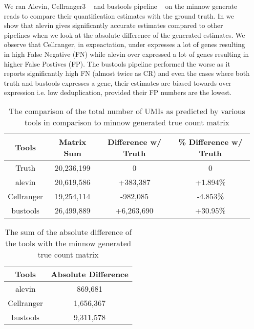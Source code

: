 We ran Alevin, Cellranger3 ~\citep{tenx} and bustools pipeline ~\citep{melsted2019modular} on the minnow 
generate reads to compare their quantification estimates with the ground truth. 
In  we show that alevin gives significantly accurate estimates 
compared to other pipelines when we look at the absolute difference of the generated estimates. We observe 
that Cellranger, in expeactation, under expresses a lot of genes resulting in high False Negative (FN) 
while alevin over expressed a lot of genes resulting in higher False Postives (FP). 
The bustools pipeline performed the worse as it reports significantly high FN (almost twice as CR) 
and even the cases where both truth and bustools expresses a gene, their estimates are biased towards 
over expression i.e. low deduplication, provided their FP numbers are the lowest.

\begin{table}[h!]
	\centering
	 \begin{tabular}{|| c | c c c||} 
		 \hline
		 Tools & Matrix Sum & Difference w/ Truth & \% Difference w/ Truth \\ [0.5ex] 
		 \hline\hline
		 Truth & 20,236,199  & 0 & 0 \\ 
		 \hline
		 alevin & 20,619,586 & +383,387 & +1.894\% \\
		 \hline
		 Cellranger & 19,254,114 & -982,085 & -4.853\% \\
		 \hline
		 bustools & 26,499,889 & +6,263,690 & +30.95\% \\ [1ex] 
		 \hline
 	\end{tabular}
	\caption{The comparison of the total number of UMIs as predicted by various tools 
	in comparison to minnow generated true count matrix }
	\label{tab:matrix_sum}
\end{table}

\begin{table}[h!]
	\centering
	 \begin{tabular}{|| c | c||} 
		 \hline
		 Tools & Absolute Difference \\ [0.5ex] 
		 \hline\hline
		 alevin & 869,681 \\
		 \hline
		 Cellranger & 1,656,367 \\
		 \hline
		 bustools & 9,311,578 \\ [1ex] 
		 \hline
 	\end{tabular}
	\caption{The sum of the absolute difference of the tools with the minnow generated 
	true count matrix }
	\label{tab:matrix_diff}
\end{table}

